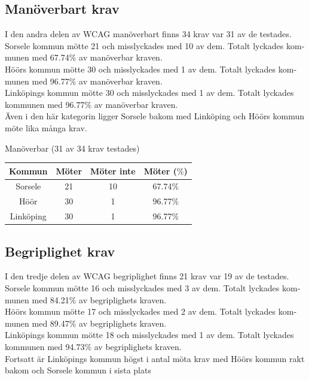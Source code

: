 \documentclass[11p]{article}
\begin{document}
\begin{otherlanguage}{swedish}
    \subsection{Manöverbart krav}
    I den andra delen av WCAG manöverbart finns 34 krav var 31 av de testades.
    Sorsele kommun mötte 21 och misslyckades med 10 av dem.
    Totalt lyckades kommunen med 67.74$\%$ av manöverbar kraven.
    \\Höörs kommun mötte 30 och misslyckades med 1 av dem.
    Totalt lyckades kommunen med 96.77$\%$ av manöverbar kraven.
    \\Linköpings kommun mötte 30 och misslyckades med 1 av dem.
    Totalt lyckades kommunen med 96.77$\%$ av manöverbar kraven.
    \\Även i den här kategorin ligger Sorsele bakom med Linköping och Höörs kommun möte lika många krav.

    \begin{center}
    Manöverbar (31 av 34 krav testades)

    \begin{tabular}{ |c|c|c|c|}
        \hline
        Kommun & Möter & Möter inte & Möter ($\%$) \\  \hline
        Sorsele & 21 & 10 & 67.74$\%$ \\ \hline
        Höör & 30 & 1 & 96.77$\%$ \\ \hline
        Linköping & 30 & 1 & 96.77$\%$ \\ \hline
    \end{tabular}
    \end{center}

    \subsection{Begriplighet krav}
    I den tredje delen av WCAG begriplighet finns 21 krav var 19 av de testades.
    Sorsele kommun mötte 16 och misslyckades med 3 av dem.
    Totalt lyckades kommunen med 84.21$\%$ av begriplighets kraven.
    \\Höörs kommun mötte 17 och misslyckades med 2 av dem.
    Totalt lyckades kommunen med 89.47$\%$ av begriplighets kraven.
    \\Linköpings kommun mötte 18 och misslyckades med 1 av dem.
    Totalt lyckades kommunen med 94.73$\%$ av begriplighets kraven.
    \\Fortsatt är Linköpings kommun högst i antal möta krav med Höörs kommun rakt bakom och Sorsele kommun i sista plats


\end{otherlanguage}
\end{document}
